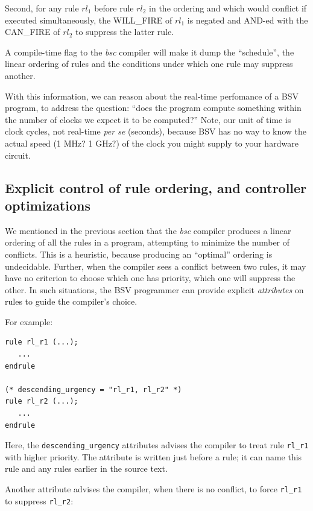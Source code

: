 Second, for any rule $rl_1$ before rule $rl_2$ in the ordering and
which would conflict if executed simultaneously, the WILL\_FIRE of
$rl_1$ is negated and AND-ed with the CAN\_FIRE of $rl_2$ to suppress
the latter rule.

A compile-time flag to the \emph{bsc} compiler will make it dump the
``schedule'', {\ie} the linear ordering of rules and the conditions
under which one rule may suppress another.

With this information, we can reason about the real-time perfomance of
a BSV program, {\ie} to address the question: ``does the program
compute something within the number of clocks we expect it to be
computed?''  Note, our unit of time is clock cycles, not real-time
\emph{per se} (seconds), because BSV has no way to know the actual
speed (1 MHz?  1 GHz?) of the clock you might supply to your hardware
circuit.


\subsection{Explicit control of rule ordering, and controller optimizations}

We mentioned in the previous section that the \emph{bsc} compiler
produces a linear ordering of all the rules in a program, attempting
to minimize the number of conflicts.  This is a heuristic, because
producing an ``optimal'' ordering is undecidable.  Further, when the
compiler sees a conflict between two rules, it may have no criterion
to choose which one has priority, {\ie} which one will suppress the
other.  In such situations, the BSV programmer can provide explicit
\emph{attributes} on rules to guide the compiler's choice.

For example:

{\footnotesize
\begin{Verbatim}[frame=single,label=BSV]
rule rl_r1 (...);
   ...
endrule

(* descending_urgency = "rl_r1, rl_r2" *)
rule rl_r2 (...);
   ...
endrule
\end{Verbatim}
}

Here, the \verb|descending_urgency| attributes advises the compiler to
treat rule \verb|rl_r1| with higher priority.  The attribute is
written just before a rule; it can name this rule and any rules
earlier in the source text.

Another attribute advises the compiler, when there is no conflict, to
force \verb|rl_r1| to suppress \verb|rl_r2|:


